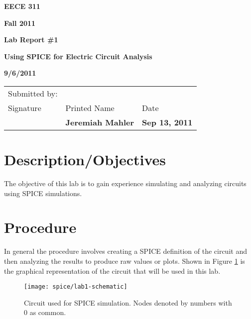 \documentclass{article}
\begin{document}


\centerline{\bf EECE 311}
\centerline{\bf Fall 2011}
\centerline{\bf}
\centerline{\bf Lab Report \#1}
\centerline{\bf Using SPICE for Electric Circuit Analysis}
\centerline{\bf 9/6/2011}  %

\begin{center}
\begin{tabularx}{\textwidth}[b]{X l l}
Submitted by: & & \\
Signature & Printed Name & Date \\
\hline
\multicolumn{1}{|X|}{} & \multicolumn{1}{|l|}{\bigstrut \bf Jeremiah Mahler} & \multicolumn{1}{|l|}{\bf Sep 13, 2011} \\
\hline
\end{tabularx}
\end{center}

\section{Description/Objectives}


The objective of this lab is to gain experience simulating and analyzing
circuits using SPICE simulations.


\section{Procedure}

In general the procedure involves creating a SPICE definition of the circuit
and then analyzing the results to produce raw values or plots.
Shown in Figure \ref{fig:circuit} is the graphical representation of the
 circuit that will be used in this lab.

\begin{figure}[!hbtp]
\center
\texttt{[image: spice/lab1-schematic]}
\caption{Circuit used for SPICE simulation.
Nodes denoted by numbers with 0 as common.}
\label{fig:circuit}
\end{figure}
\end{document}
